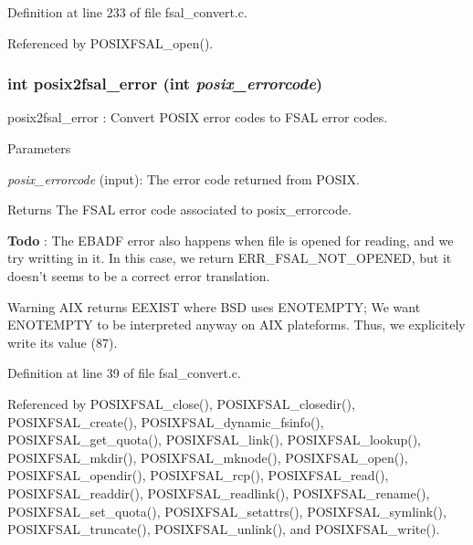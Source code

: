 Definition at line 233 of file fsal\_\-convert.c.

Referenced by POSIXFSAL\_\-open().
\subsubsection[{posix2fsal\_\-error}]{\setlength{\rightskip}{0pt plus 5cm}int posix2fsal\_\-error (int {\em posix\_\-errorcode})}\label{fsal__convert_8c_ad420f004b68f6720ab45980298177bd9}
posix2fsal\_\-error : Convert POSIX error codes to FSAL error codes.


\begin{DoxyParams}{Parameters}
\item[{\em posix\_\-errorcode}](input): The error code returned from POSIX.\end{DoxyParams}
\begin{DoxyReturn}{Returns}
The FSAL error code associated to posix\_\-errorcode. 
\end{DoxyReturn}


\begin{Desc}
\item[{\bf Todo}]: The EBADF error also happens when file is opened for reading, and we try writting in it. In this case, we return ERR\_\-FSAL\_\-NOT\_\-OPENED, but it doesn't seems to be a correct error translation. \end{Desc}


\begin{DoxyWarning}{Warning}
AIX returns EEXIST where BSD uses ENOTEMPTY; We want ENOTEMPTY to be interpreted anyway on AIX plateforms. Thus, we explicitely write its value (87).
\end{DoxyWarning}


Definition at line 39 of file fsal\_\-convert.c.

Referenced by POSIXFSAL\_\-close(), POSIXFSAL\_\-closedir(), POSIXFSAL\_\-create(), POSIXFSAL\_\-dynamic\_\-fsinfo(), POSIXFSAL\_\-get\_\-quota(), POSIXFSAL\_\-link(), POSIXFSAL\_\-lookup(), POSIXFSAL\_\-mkdir(), POSIXFSAL\_\-mknode(), POSIXFSAL\_\-open(), POSIXFSAL\_\-opendir(), POSIXFSAL\_\-rcp(), POSIXFSAL\_\-read(), POSIXFSAL\_\-readdir(), POSIXFSAL\_\-readlink(), POSIXFSAL\_\-rename(), POSIXFSAL\_\-set\_\-quota(), POSIXFSAL\_\-setattrs(), POSIXFSAL\_\-symlink(), POSIXFSAL\_\-truncate(), POSIXFSAL\_\-unlink(), and POSIXFSAL\_\-write().
